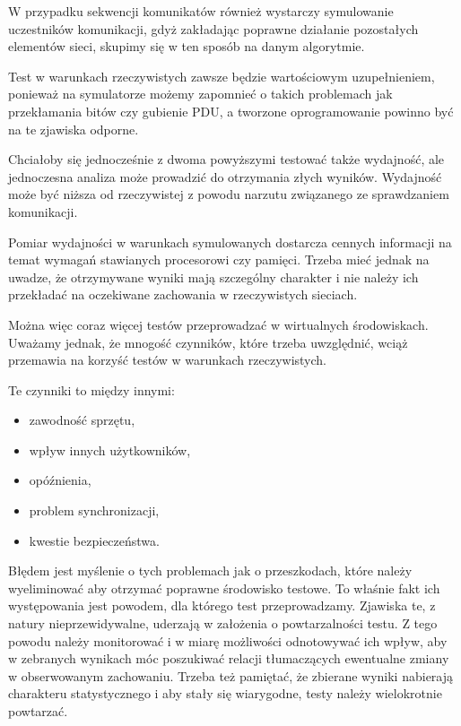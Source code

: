 \documentclass[00-praca-magisterska.tex]{subfiles}
\begin{document}
W przypadku sekwencji komunikatów również wystarczy symulowanie
uczestników komunikacji, gdyż zakładając poprawne działanie pozostałych
elementów sieci, skupimy się w ten sposób na danym algorytmie.

Test w warunkach rzeczywistych zawsze będzie wartościowym uzupełnieniem,
ponieważ na symulatorze możemy zapomnieć o takich problemach jak przekłamania
bitów czy gubienie PDU, a tworzone oprogramowanie powinno być na te zjawiska odporne.

Chciałoby się jednocześnie z dwoma powyższymi testować także wydajność, ale
jednoczesna analiza może prowadzić do otrzymania złych wyników. Wydajność może
być niższa od rzeczywistej z powodu narzutu związanego ze sprawdzaniem
komunikacji.

Pomiar wydajności w warunkach symulowanych dostarcza cennych informacji na
temat wymagań stawianych procesorowi czy pamięci. Trzeba mieć jednak na uwadze,
że otrzymywane wyniki mają szczególny charakter i nie należy ich przekładać na
oczekiwane zachowania w rzeczywistych sieciach. 

 Można więc coraz więcej testów przeprowadzać w wirtualnych
środowiskach. Uważamy jednak, że mnogość czynników, które trzeba uwzględnić,
wciąż przemawia na korzyść testów w warunkach rzeczywistych.

Te czynniki to między innymi:
\begin{itemize}
\item zawodność sprzętu,
\item wpływ innych użytkowników,
\item opóźnienia,
\item problem synchronizacji,
\item kwestie bezpieczeństwa.
\end{itemize}

Błędem jest myślenie o tych problemach jak o przeszkodach, które należy
wyeliminować aby otrzymać poprawne środowisko testowe. To właśnie fakt ich
występowania jest powodem, dla którego test przeprowadzamy. Zjawiska te, z
natury nieprzewidywalne, uderzają w założenia o powtarzalności testu. Z tego
powodu należy monitorować i w miarę możliwości odnotowywać ich wpływ, aby w
zebranych wynikach móc poszukiwać relacji tłumaczących ewentualne zmiany w
obserwowanym zachowaniu. Trzeba też pamiętać, że zbierane wyniki nabierają
charakteru statystycznego i aby stały się wiarygodne, testy należy wielokrotnie
powtarzać.
\end{document}
